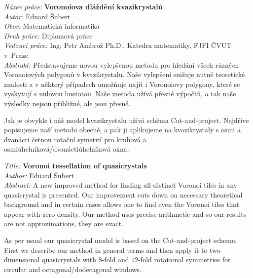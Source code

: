 \documentclass[a4paper,10pt,twoside]{report}
\theoremstyle{remark}
\begin{document}
{
\setlength{\parindent}{0pt}

\textit{Název práce:}
\textbf{Voronoiova dláždění kvazikrystalů} \\

\textit{Autor:} Eduard Šubert \\

\textit{Obor:} Matematická informatika \\

\textit{Druh práce:} Diplomová práce \\

\textit{Vedoucí práce:}  Ing. Petr Ambrož Ph.D., Katedra matematiky, FJFI ČVUT v~Praze \\

\textit{Abstrakt:} 
Představujeme novou vylepšenou metodu pro hledání všech různých Voronoiových polygonů v kvazikrystalu. Naše vylepšení snižuje nutné teoretické znalosti a v některý případech umožňuje najít i Voronoiovy polygony, které se vyskytují s nulovou hustotou. Naše metoda užívá přesné výpočtů, a tak naše výsledky nejsou přibližné, ale jsou přesné. 

Jak je obvykle i náš model kvazikrystalu užívá schéma Cut-and-project. Nejdříve popisujeme naší metodu obecně, a pak ji aplikujeme na kvazikrystaly s osmi a dvanácti četnou rotační symetrií pro kruhová a osmiúhelníková/dvanáctiúhelníková okna. 

\vspace{1.5cm}

\textit{Title:}
\textbf{Voronoi tessellation of quasicrystals} \\

\textit{Author:} Eduard Šubert\\

\textit{Abstract:} 
A new improved method for finding all distinct Voronoi tiles in any quasicrystal is presented. Our improvement cuts down on necessary theoretical background and in certain cases allows one to find even the Voronoi tiles that appear with zero density. Our method uses precise arithmetic and so our results are not approximations, they are exact. 

As per usual our quasicrystal model is based on the Cut-and-project scheme. First we describe our method in general terms and then apply it to two dimensional quasicrystals with $8$-fold and $12$-fold rotational symmetries for circular and octagonal/dodecagonal windows. 


}

\end{document}
